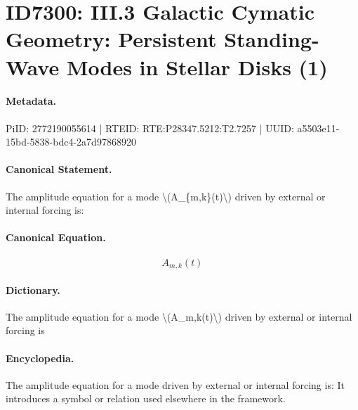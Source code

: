 \section*{ID7300: III.3 Galactic Cymatic Geometry: Persistent Standing-Wave Modes in Stellar Disks (1)}
\paragraph{Metadata.}
PiID: 2772190055614 | RTEID: RTE:P28347.5212:T2.7257 | UUID: a5503e11-15bd-5838-bdc4-2a7d97868920

\paragraph{Canonical Statement.}
The amplitude equation for a mode \textbackslash{}(A\_\{m,k\}(t)\textbackslash{}) driven by external or internal forcing is:

\paragraph{Canonical Equation.}
\[
A_{m,k}(t)
\]

\paragraph{Dictionary.}
The amplitude equation for a mode \textbackslash{}(A\_m,k(t)\textbackslash{}) driven by external or internal forcing is

\paragraph{Encyclopedia.}
The amplitude equation for a mode driven by external or internal forcing is: It introduces a symbol or relation used elsewhere in the framework.
